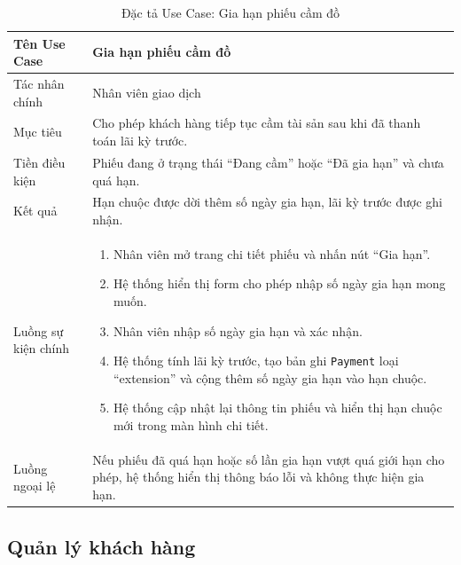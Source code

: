\documentclass[13pt,a4paper]{extreport}
\begin{document}
\begin{table}[H]
\centering
\caption{Đặc tả Use Case: Gia hạn phiếu cầm đồ}
\label{tab:uc-extend}
\begin{tabular}{p{4cm}p{10cm}}
\hline
Tên Use Case & Gia hạn phiếu cầm đồ\\
\hline
Tác nhân chính & Nhân viên giao dịch\\
Mục tiêu & Cho phép khách hàng tiếp tục cầm tài sản sau khi đã thanh toán lãi kỳ trước.\\
Tiền điều kiện & Phiếu đang ở trạng thái ``Đang cầm'' hoặc ``Đã gia hạn'' và chưa quá hạn.\\
Kết quả & Hạn chuộc được dời thêm số ngày gia hạn, lãi kỳ trước được ghi nhận.\\
\hline
Luồng sự kiện chính &
\begin{enumerate}
  \item Nhân viên mở trang chi tiết phiếu và nhấn nút ``Gia hạn''.
  \item Hệ thống hiển thị form cho phép nhập số ngày gia hạn mong muốn.
  \item Nhân viên nhập số ngày gia hạn và xác nhận.
  \item Hệ thống tính lãi kỳ trước, tạo bản ghi \texttt{Payment} loại ``extension'' và cộng thêm số ngày gia hạn vào hạn chuộc.
  \item Hệ thống cập nhật lại thông tin phiếu và hiển thị hạn chuộc mới trong màn hình chi tiết.
\end{enumerate}\\
\hline
Luồng ngoại lệ &
Nếu phiếu đã quá hạn hoặc số lần gia hạn vượt quá giới hạn cho phép, hệ thống hiển thị thông báo lỗi và không thực hiện gia hạn.\\
\hline
\end{tabular}
\end{table}

\subsection*{Quản lý khách hàng}
\end{document}
